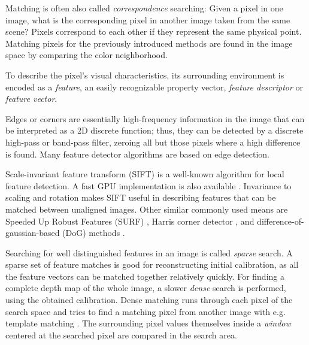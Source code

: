 Matching is often also called \emph{correspondence} searching:
Given a pixel in one image, what is the corresponding pixel in another image taken from the same scene?
Pixels correspond to each other if they represent the same physical point.
Matching pixels for the previously introduced methods are found in the image space by comparing the color neighborhood.


To describe the pixel's visual characteristics, its surrounding environment is encoded as a \emph{feature}, an easily recognizable property vector, \emph{feature descriptor} or \emph{feature vector}.

Edges or corners are essentially high-frequency information in the image that can be interpreted as a 2D discrete function; thus, they can be detected by a discrete high-pass or band-pass filter, zeroing all but those pixels where a high difference is found. \cite{marr1980theory}
Many feature detector algorithms are based on edge detection. %

Scale-invariant feature transform (SIFT) \cite{lowe1999object} is a well-known algorithm for local feature detection. A fast GPU implementation is also available \cite{changchang2007siftgpu}.  Invariance to scaling and rotation makes SIFT useful in describing features that can be matched between unaligned images. Other similar commonly used means are Speeded Up Robust Features (SURF) \cite{bay2006surf}, Harris corner detector \cite{harris1988combined}, and difference-of-gaussian-based (DoG) methods \cite{dog}.

Searching for well distinguished features in an image is called \emph{sparse} search.
A sparse set of feature matches is good for reconstructing initial calibration, as all the feature vectors can be matched together relatively quickly.
For finding a complete depth map of the whole image, a slower \emph{dense} search is performed, using the obtained calibration.
Dense matching runs through each pixel of the search space and tries to find a matching pixel from another image with e.g. template matching \cite{duda1973pattern}.
The surrounding pixel values themselves inside a \emph{window} centered at the searched pixel are compared in the search area.

